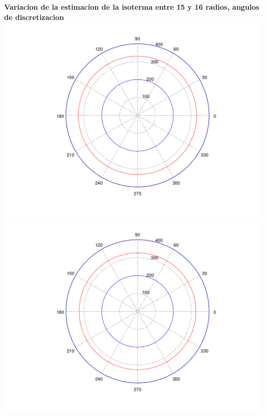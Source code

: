\begin{enumerate}
	  	\textbf{Variacion de la estimacion de la isoterma entre 15 y 16 radios, angulos de discretizacion}\\
		\includegraphics[scale=0.35]{experimentos1a_1b/evolucion_posicion_isoterma_temperatura/variacion_radios_angulos_se_reduce_diferencia_radial/test11_testord_045_inst_001_isomap.png}
		\includegraphics[scale=0.35]{experimentos1a_1b/evolucion_posicion_isoterma_temperatura/variacion_radios_angulos_se_reduce_diferencia_radial/test11_testord_046_inst_001_isomap.png}


\end{enumerate}
